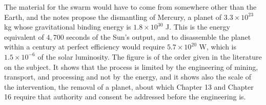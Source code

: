The material for the swarm would have to come from somewhere other than the Earth, and the notes propose the dismantling of Mercury, a planet of $3.3\times10^{23}$ kg whose gravitational binding energy is $1.8\times10^{30}$ J. This is the energy equivalent of $4{,}700$ seconds of the Sun's output, and to disassemble the planet within a century at perfect efficiency would require $5.7\times10^{20}$ W, which is $1.5\times10^{-6}$ of the solar luminosity. The figure is of the order given in the literature on the subject. It shows that the process is limited by the engineering of mining, transport, and processing and not by the energy, and it shows also the scale of the intervention, the removal of a planet, about which Chapter 13 and Chapter 16 require that authority and consent be addressed before the engineering is.

